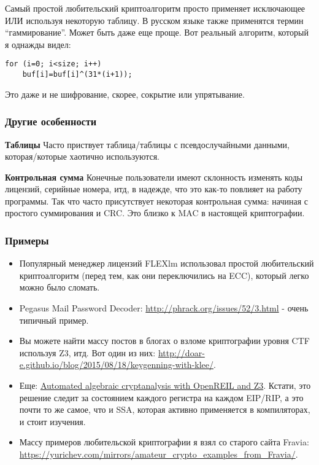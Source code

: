 Самый простой любительский криптоалгоритм просто применяет исключающее ИЛИ используя некоторую таблицу.
В русском языке также применятся термин ``гаммирование''.
Может быть даже еще проще. Вот реальный алгоритм, который я однажды видел:

\begin{lstlisting}
for (i=0; i<size; i++)
    buf[i]=buf[i]^(31*(i+1));
\end{lstlisting}

Это даже и не шифрование, скорее, сокрытие или упрятывание.

\subsubsection{Другие особенности}

\textbf{Таблицы} Часто приствует таблица/таблицы с псевдослучайными данными, которая/которые хаотично используются.

\textbf{Контрольная сумма} Конечные пользователи имеют склонность изменять коды лицензий, серийные номера, итд,
в надежде, что это как-то повлияет на работу программы.
Так что часто присутствует некоторая контрольная сумма: начиная с простого суммирования и \ac{CRC}.
Это близко к \ac{MAC} в настоящей криптографии.

\subsubsection{Примеры}

\begin{itemize}

\item Популярный менеджер лицензий FLEXlm использовал простой любительский криптоалгоритм
(перед тем, как они переключились на \ac{ECC}), который легко можно было сломать.

\item Pegasus Mail Password Decoder: \url{http://phrack.org/issues/52/3.html} -
очень типичный пример.

\item Вы можете найти массу постов в блогах о взломе криптографии уровня \ac{CTF} используя Z3, итд.
Вот один из них: \url{http://doar-e.github.io/blog/2015/08/18/keygenning-with-klee/}.

\item Еще: \href{http://blog.cr4.sh/2015/03/automated-algebraic-cryptanalysis-with.html}{Automated algebraic cryptanalysis with OpenREIL and Z3}.
Кстати, это решение следит за состоянием каждого регистра на каждом EIP/RIP, а это почти то же самое, что и \ac{SSA},
которая активно применяется в компиляторах, и стоит изучения.

\item Массу примеров любительской криптографии я взял со старого сайта Fravia:
\url{https://yurichev.com/mirrors/amateur_crypto_examples_from_Fravia/}.

\end{itemize}



